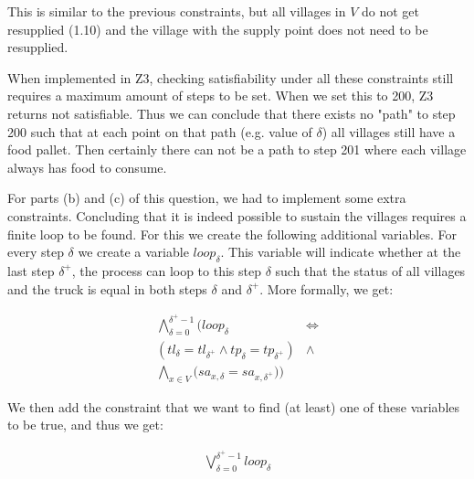 This is similar to the previous constraints, but all villages in $V$ do not get resupplied (1.10) and the village with the supply point does not need to be resupplied.

When implemented in Z3, checking satisfiability under all these constraints still requires a maximum amount of steps to be set. When we set this to 200, Z3 returns not satisfiable. Thus we can conclude that there exists no "path" to step 200 such that at each point on that path (e.g. value of $\delta$) all villages still have a food pallet. Then certainly there can not be a path to step 201 where each village always has food to consume. 

For parts (b) and (c) of this question, we had to implement some extra constraints. Concluding that it is indeed possible to sustain the villages requires a finite loop to be found. For this we create the following additional variables. For every step $\delta$ we create a variable $loop_{\delta}$. This variable will indicate whether at the last step $\delta^{+}$, the process can loop to this step $\delta$ such that the status of all villages and the truck is equal in both steps $\delta$ and $\delta^{+}$. More formally, we get:

\begin{align}
    \bigwedge^{\delta^{+} - 1}_{\delta=0}\bigg(loop_{\delta} & \Longleftrightarrow \\
    (tl_{\delta} = tl_{\delta^{+}} \wedge tp_{\delta} = tp_{\delta^{+}}) & \wedge \\
    \bigwedge_{x \in V}\big(sa_{x,\delta} = sa_{x,\delta^{+}}\big)\bigg)
\end{align}

We then add the constraint that we want to find (at least) one of these variables to be true, and thus we get:

\begin{align}
    \bigvee^{\delta^{+} - 1}_{\delta=0} loop_{\delta}
\end{align}

